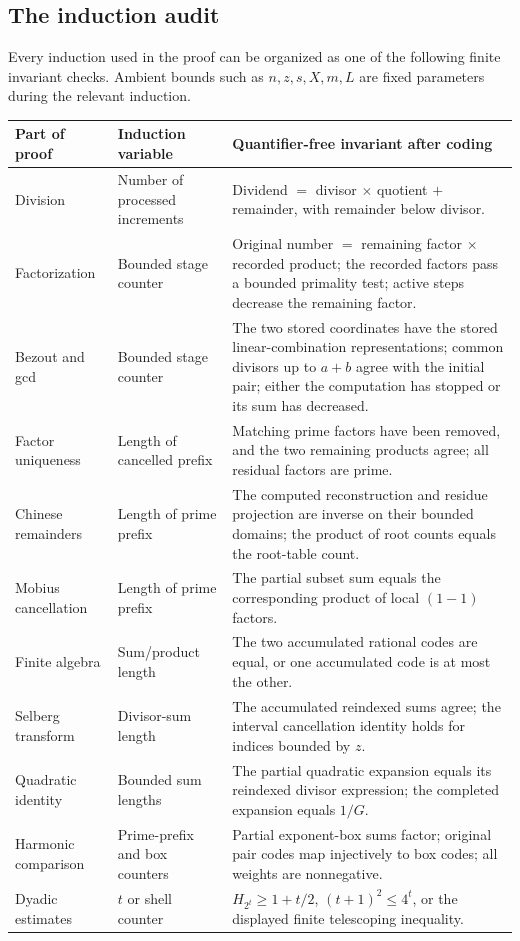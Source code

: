 \subsection{The induction audit}

Every induction used in the proof can be organized as one of the following
finite invariant checks. Ambient bounds such as \(n,z,s,X,m,L\) are fixed
parameters during the relevant induction.

\renewcommand{\arraystretch}{1.12}
\begin{longtable}{@{}p{}p{}p{}@{}}
\toprule
Part of proof & Induction variable & Quantifier-free invariant after coding\\
\midrule
\endhead
Division & Number of processed increments &
Dividend \(=\) divisor \(\times\) quotient \(+\) remainder, with remainder
below divisor.\\
Factorization & Bounded stage counter &
Original number \(=\) remaining factor \(\times\) recorded product;
the recorded factors pass a bounded primality test; active steps decrease
the remaining factor.\\
Bezout and gcd & Bounded stage counter &
The two stored coordinates have the stored linear-combination
representations; common divisors up to \(a+b\) agree with the initial
pair; either the computation has stopped or its sum has decreased.\\
Factor uniqueness & Length of cancelled prefix &
Matching prime factors have been removed, and the two remaining
products agree; all residual factors are prime.\\
Chinese remainders & Length of prime prefix &
The computed reconstruction and residue projection are inverse on their
bounded domains; the product of root counts equals the root-table count.\\
Mobius cancellation & Length of prime prefix &
The partial subset sum equals the corresponding product of local
\((1-1)\) factors.\\
Finite algebra & Sum/product length &
The two accumulated rational codes are equal, or one accumulated code
is at most the other.\\
Selberg transform & Divisor-sum length &
The accumulated reindexed sums agree; the interval cancellation identity
holds for indices bounded by \(z\).\\
Quadratic identity & Bounded sum lengths &
The partial quadratic expansion equals its reindexed divisor expression;
the completed expansion equals \(1/G\).\\
Harmonic comparison & Prime-prefix and box counters &
Partial exponent-box sums factor; original pair codes map injectively to
box codes; all weights are nonnegative.\\
Dyadic estimates & \(t\) or shell counter &
\(H_{2^t}\ge1+t/2\), \((t+1)^2\le4^t\), or the displayed finite
telescoping inequality.\\
\bottomrule
\end{longtable}

